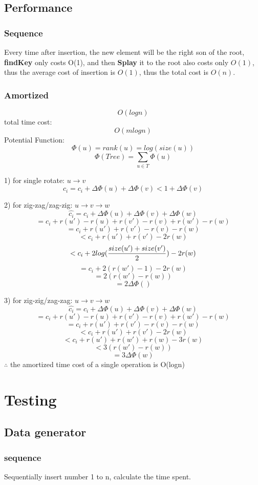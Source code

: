 \documentclass{article}
\begin{document}
\subsection{Performance}
\subsubsection{Sequence}
Every time after insertion, the new element will be the right son of the root, \textbf{findKey} only costs O(1), and then \textbf{Splay} it to the root also costs only $O(1)$, thus the average cost of insertion is $O(1)$, thus the total cost is $O(n)$.
\subsubsection{Amortized}
$$O(logn)$$ 
total time cost: $$O(mlogn)$$
Potential Function:$$\Phi(u)=rank(u)=log(size(u))$$
$$\Phi(Tree)=\sum_{u\in T}\Phi(u)$$
\par
1) for single rotate: $u\rightarrow v$ 
$$\hat{c_i} = c_i + \Delta\Phi (u) + \Delta\Phi (v)<1+\Delta\Phi(v)$$
\par
2) for zig-zag/zag-zig:
$u\rightarrow v\rightarrow w$
$$\hat{c_i} = c_i + \Delta\Phi (u) + \Delta\Phi (v) + \Delta\Phi(w)$$
$$=c_i + r(u')-r(u)+r(v')-r(v)+r(w')-r(w)$$
$$=c_i + r(u')+r(v')-r(v)-r(w)$$
$$<c_i + r(u')+r(v')-2r(w)$$
$$<c_i + 2log({{size(u')+ size(v')\over 2}})-2r(w)$$
$$=c_i+2(r(w')-1)-2r(w)$$
$$=2(r(w')-r(w))$$
$$=2\Delta\Phi()$$
\par
3) for zig-zig/zag-zag: $u\rightarrow v\rightarrow w$
$$\hat{c_i} = c_i + \Delta\Phi (u) + \Delta\Phi (v) + \Delta\Phi(w)$$
$$=c_i + r(u')-r(u)+r(v')-r(v)+r(w')-r(w)$$
$$=c_i + r(u')+r(v')-r(v)-r(w)$$
$$<c_i + r(u')+r(v')-2r(w)$$
$$<c_i + r(u') + r(w') + r(w)-3r(w)$$
$$<3(r(w')-r(w))$$
$$=3\Delta\Phi(w)$$
$\therefore$ the amortized time cost of a single operation is O(logn)
\par

\section{Testing}
\subsection{Data generator}
\subsubsection{sequence}
Sequentially insert number 1 to n, calculate the time spent.
\end{document}
